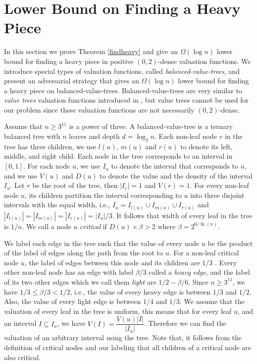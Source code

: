 \section{Lower Bound on Finding a Heavy Piece}
In this section we prove Theorem \ref{findheavy} and give an $\Omega( \log n)$ lower bound for finding a heavy piece in positive $(0,2)$-dense valuation functions. We introduce special types of valuation functions, called \textit{balanced-value-trees}, and present an adversarial strategy that gives an $\Omega( \log n)$ lower bound for finding a heavy piece on balanced-value-trees. Balanced-value-trees are very similar to \textit{value trees} valuation functions introduced in \cite{edmonds2006cake}, but value trees cannot be used for our problem since these valuation functions are not necessarily $(0,2)$-dense.

Assume that $n \ge 3^{11}$ is a power of three. A balanced-value-tree is a ternary balanced tree with $n$ leaves and depth $d=\log_3 n$. Each non-leaf node $v$ in the tree has three children, we use $l(u)$, $m(u)$ and $r(u)$ to denote its left, middle, and right child. Each node in the tree corresponds to an interval in $[0,1]$. For each node $u$, we use $I_u$ to denote the interval that corresponds to $u$, and we use $V(u)$ and $D(u)$ to denote the value and the density of the interval $I_u$. Let $r$ be the root of the tree, then $|I_r|=1$ and $V(r)=1$. For every non-leaf node $u$, its children partition the interval corresponding to $u$ into three disjoint intervals with the equal width, i.e., $I_{u} = I_{l(u)} \cup I_{m(u)} \cup I_{r(u)}$ and $|I_{l(u)}| = |I_{m(u)}| = |I_{r(u)}|= |I_u|/3$. It follows that width of every leaf in the tree is $1/n$. We call a node $u$ \textit{critical} if $D(u) \times \beta > 2$ where $\beta= 2^{6/ \ln(n)}$.

We label each edge in the tree such that the value of every node $u$ be the product of the label of edges along the path from the root to $u$. For a non-leaf critical node $u$, the label of edges between this node and its children are $1/3$ . Every other non-leaf node has an edge with label $\beta/3$ called a \textit{heavy edge}, and the label of its two other edges which we call them \textit{light} are $1/2-\beta/6$. Since $n \ge 3^{11}$, we have $1/3 \le \beta/3 < 1/2$, i.e., the value of every heavy edge is between $1/3$ and $1/2$. Also, the value of every light edge is between $1/4$ and $1/3$.  We assume that the valuation of every leaf in the tree is uniform, this means that for every leaf $u$, and an interval $I \subseteq I_u$, we have $V(I)=\dfrac{V(u) |I|}{|I_u|}$. Therefore we can find the valuation of an arbitrary interval using the tree. Note that, it follows from the definition of critical nodes and our labeling that all children of a critical node are also critical. 

